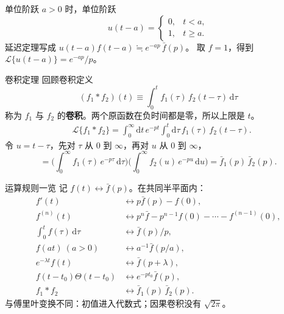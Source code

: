 \documentclass[fontset=windows, chinese, 10pt, xcolor=dvipsnames]{beamer}
\begin{document}
\begin{frame}{单位阶跃}
  $a>0$ 时，单位阶跃
  \begin{equation*}
    u(t-a)=\begin{cases}
      0, & t<a,\\
      1, & t\ge a.
    \end{cases}
  \end{equation*}
  延迟定理写成 $u(t-a)f(t-a)\fallingdotseq e^{-ap}\,\bar f(p)$。
  取 $f=1$，得到 $\mathcal{L}\{u(t-a)\}=e^{-ap}/p$。
  \vspace{0.3em}
  \centering
\end{frame}

\begin{frame}{卷积定理}
  回顾卷积定义
  \begin{equation*}
    (f_1*f_2)(t)
    \equiv\int_0^t f_1(\tau)\,f_2(t-\tau)\,\mathrm{d}\tau
  \end{equation*}
  称为 $f_1$ 与 $f_2$ 的\textbf{卷积}。两个原函数在负时间都是零，所以上限是 $t$。
  \begin{align*}
    &\mathcal{L}\{f_1*f_2\}
    =\int_0^{\infty}\mathrm{d}t\,e^{-pt}
      \int_0^t\mathrm{d}\tau\,f_1(\tau)\,f_2(t-\tau).
  \end{align*}
  令 $u=t-\tau$，先对 $\tau$ 从 $0$ 到 $\infty$，再对 $u$ 从 $0$ 到 $\infty$，
  \begin{equation*}
    =\Biggl(\int_0^{\infty} f_1(\tau)\,e^{-p\tau}\,\mathrm{d}\tau\Biggr)
     \Biggl(\int_0^{\infty} f_2(u)\,e^{-pu}\,\mathrm{d}u\Biggr)
    =\bar f_1(p)\,\bar f_2(p).
  \end{equation*}
\end{frame}

\begin{frame}{运算规则一览}
  记 $f(t)\longleftrightarrow\bar f(p)$。在共同半平面内：
  \begin{align*}
    f'(t)
      &\longleftrightarrow p\bar f(p)-f(0),\\
    f^{(n)}(t)
      &\longleftrightarrow
        p^n\bar f
        -p^{n-1}f(0)-\cdots-f^{(n-1)}(0),\\
    \int_0^{t}f(\tau)\,\mathrm{d}\tau
      &\longleftrightarrow\bar f(p)/p,\\
    f(at)\ (a>0)
      &\longleftrightarrow a^{-1}\bar f(p/a),\\
    e^{-\lambda t}f(t)
      &\longleftrightarrow\bar f(p+\lambda),\\
    f(t-t_0)\Theta(t-t_0)
      &\longleftrightarrow e^{-pt_0}\bar f(p),\\
    f_1*f_2
      &\longleftrightarrow\bar f_1(p)\,\bar f_2(p).
  \end{align*}
  与傅里叶变换不同：初值进入代数式；因果卷积没有 $\sqrt{2\pi}$。
\end{frame}
\end{document}
